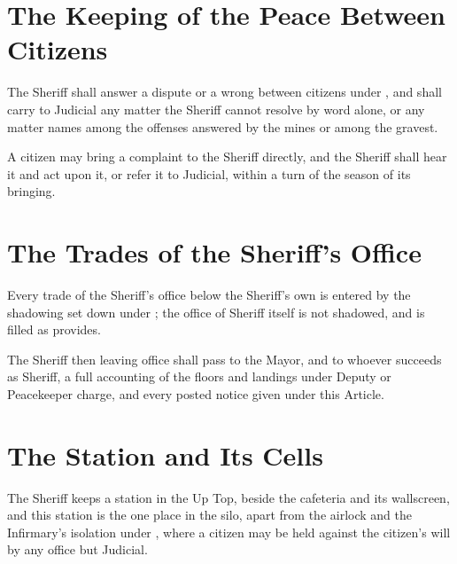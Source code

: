 \section{The Keeping of the Peace Between Citizens}
\label{sec:sheriff:keeping-of-the-peace-between-citizens}

The Sheriff shall answer a dispute or a wrong between citizens under , and shall carry to Judicial any matter the Sheriff cannot resolve by word alone, or any matter  names among the offenses answered by the mines or among the gravest.

\begin{clauses}
\item A citizen may bring a complaint to the Sheriff directly, and the Sheriff shall hear it and act upon it, or refer it to Judicial, within a turn of the season of its bringing.
\end{clauses}

\section{The Trades of the Sheriff's Office}
\label{sec:sheriff:trades-of-the-sheriffs-office}

Every trade of the Sheriff's office below the Sheriff's own is entered by the shadowing set down under ; the office of Sheriff itself is not shadowed, and is filled as  provides.

\begin{clauses}
\item The Sheriff then leaving office shall pass to the Mayor, and to whoever succeeds as Sheriff, a full accounting of the floors and landings under Deputy or Peacekeeper charge, and every posted notice given under this Article.
\end{clauses}

\section{The Station and Its Cells}
\label{sec:sheriff:station-and-its-cells}

The Sheriff keeps a station in the Up Top, beside the cafeteria and its wallscreen, and this station is the one place in the silo, apart from the airlock and the Infirmary's isolation under , where a citizen may be held against the citizen's will by any office but Judicial.

